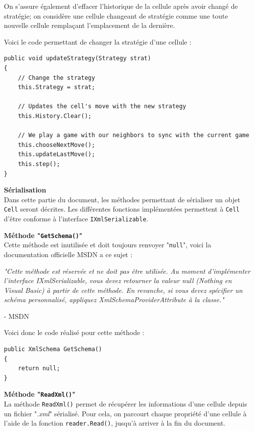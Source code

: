 \documentclass[a4paper, french]{article}
\begin{document}
On s'assure également d'effacer l'historique de la cellule après avoir changé de stratégie; on considère une cellule changeant de stratégie comme une toute nouvelle cellule remplaçant l'emplacement de la dernière.

Voici le code permettant de changer la stratégie d'une cellule :

\begin{lstlisting}
public void updateStrategy(Strategy strat)
{
    // Change the strategy
    this.Strategy = strat;

    // Updates the cell's move with the new strategy
    this.History.Clear();

    // We play a game with our neighbors to sync with the current game
    this.chooseNextMove();
    this.updateLastMove();
    this.step();
}
\end{lstlisting}
\pagebreak
\textbf{Sérialisation}\\
Dans cette partie du document, les méthodes permettant de sérialiser un objet \texttt{Cell} seront décrites. Les différentes fonctions implémentées permettent à \texttt{Cell} d'être conforme à l'interface \texttt{IXmlSerializable}.

\textbf{Méthode "\texttt{GetSchema()}"}\\
Cette méthode est inutilisée et doit toujours renvoyer "\texttt{null}", voici la documentation officielle MSDN a ce sujet :

\begin{framed}
\textit{
"Cette méthode est réservée et ne doit pas être utilisée. Au moment d’implémenter l’interface IXmlSerializable, vous devez retourner la valeur null (Nothing en Visual Basic) à partir de cette méthode. En revanche, si vous devez spécifier un schéma personnalisé, appliquez XmlSchemaProviderAttribute à la classe."
}

\hfill - MSDN
\end{framed}

Voici donc le code réalisé pour cette méthode :

\begin{lstlisting}
public XmlSchema GetSchema()
{
    return null;
}
\end{lstlisting}


\textbf{Méthode "\texttt{ReadXml()}"}\\
La méthode \texttt{ReadXml()} permet de récupérer les informations d'une cellule depuis un fichier "\textit{.xml}" sérialisé. Pour cela, on parcourt chaque propriété d'une cellule à l'aide de la fonction \texttt{reader.Read()}, jusqu'à arriver à la fin du document.
\end{document}
